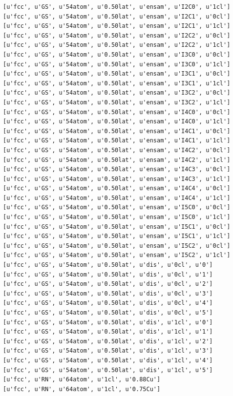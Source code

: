 \documentclass[number, sort&compress, review, 12pt]{elsarticle}
\begin{document}
\begin{verbatim}
[u'fcc', u'GS', u'54atom', u'0.50lat', u'ensam', u'I2C0', u'1cl']
[u'fcc', u'GS', u'54atom', u'0.50lat', u'ensam', u'I2C1', u'0cl']
[u'fcc', u'GS', u'54atom', u'0.50lat', u'ensam', u'I2C1', u'1cl']
[u'fcc', u'GS', u'54atom', u'0.50lat', u'ensam', u'I2C2', u'0cl']
[u'fcc', u'GS', u'54atom', u'0.50lat', u'ensam', u'I2C2', u'1cl']
[u'fcc', u'GS', u'54atom', u'0.50lat', u'ensam', u'I3C0', u'0cl']
[u'fcc', u'GS', u'54atom', u'0.50lat', u'ensam', u'I3C0', u'1cl']
[u'fcc', u'GS', u'54atom', u'0.50lat', u'ensam', u'I3C1', u'0cl']
[u'fcc', u'GS', u'54atom', u'0.50lat', u'ensam', u'I3C1', u'1cl']
[u'fcc', u'GS', u'54atom', u'0.50lat', u'ensam', u'I3C2', u'0cl']
[u'fcc', u'GS', u'54atom', u'0.50lat', u'ensam', u'I3C2', u'1cl']
[u'fcc', u'GS', u'54atom', u'0.50lat', u'ensam', u'I4C0', u'0cl']
[u'fcc', u'GS', u'54atom', u'0.50lat', u'ensam', u'I4C0', u'1cl']
[u'fcc', u'GS', u'54atom', u'0.50lat', u'ensam', u'I4C1', u'0cl']
[u'fcc', u'GS', u'54atom', u'0.50lat', u'ensam', u'I4C1', u'1cl']
[u'fcc', u'GS', u'54atom', u'0.50lat', u'ensam', u'I4C2', u'0cl']
[u'fcc', u'GS', u'54atom', u'0.50lat', u'ensam', u'I4C2', u'1cl']
[u'fcc', u'GS', u'54atom', u'0.50lat', u'ensam', u'I4C3', u'0cl']
[u'fcc', u'GS', u'54atom', u'0.50lat', u'ensam', u'I4C3', u'1cl']
[u'fcc', u'GS', u'54atom', u'0.50lat', u'ensam', u'I4C4', u'0cl']
[u'fcc', u'GS', u'54atom', u'0.50lat', u'ensam', u'I4C4', u'1cl']
[u'fcc', u'GS', u'54atom', u'0.50lat', u'ensam', u'I5C0', u'0cl']
[u'fcc', u'GS', u'54atom', u'0.50lat', u'ensam', u'I5C0', u'1cl']
[u'fcc', u'GS', u'54atom', u'0.50lat', u'ensam', u'I5C1', u'0cl']
[u'fcc', u'GS', u'54atom', u'0.50lat', u'ensam', u'I5C1', u'1cl']
[u'fcc', u'GS', u'54atom', u'0.50lat', u'ensam', u'I5C2', u'0cl']
[u'fcc', u'GS', u'54atom', u'0.50lat', u'ensam', u'I5C2', u'1cl']
[u'fcc', u'GS', u'54atom', u'0.50lat', u'dis', u'0cl', u'0']
[u'fcc', u'GS', u'54atom', u'0.50lat', u'dis', u'0cl', u'1']
[u'fcc', u'GS', u'54atom', u'0.50lat', u'dis', u'0cl', u'2']
[u'fcc', u'GS', u'54atom', u'0.50lat', u'dis', u'0cl', u'3']
[u'fcc', u'GS', u'54atom', u'0.50lat', u'dis', u'0cl', u'4']
[u'fcc', u'GS', u'54atom', u'0.50lat', u'dis', u'0cl', u'5']
[u'fcc', u'GS', u'54atom', u'0.50lat', u'dis', u'1cl', u'0']
[u'fcc', u'GS', u'54atom', u'0.50lat', u'dis', u'1cl', u'1']
[u'fcc', u'GS', u'54atom', u'0.50lat', u'dis', u'1cl', u'2']
[u'fcc', u'GS', u'54atom', u'0.50lat', u'dis', u'1cl', u'3']
[u'fcc', u'GS', u'54atom', u'0.50lat', u'dis', u'1cl', u'4']
[u'fcc', u'GS', u'54atom', u'0.50lat', u'dis', u'1cl', u'5']
[u'fcc', u'RN', u'64atom', u'1cl', u'0.88Cu']
[u'fcc', u'RN', u'64atom', u'1cl', u'0.75Cu']

\end{verbatim}
\end{document}
